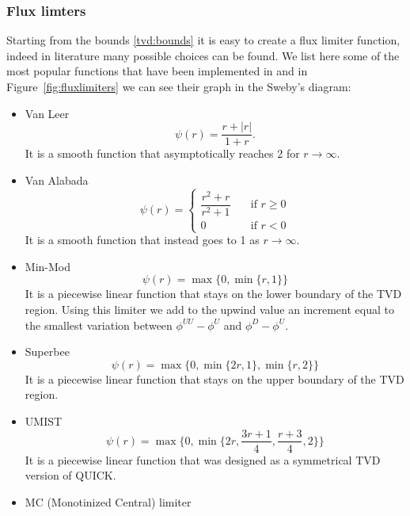 \subsubsection{Flux limters}
Starting from the bounds \eqref{tvd:bounds} it is easy to create a 
flux limiter function, indeed in literature many possible choices can be 
found. 
We list here some of the most popular functions that have been implemented in 
\DUMUX and in Figure~\ref{fig:fluxlimiters} we can see their graph in the 
Sweby's diagram:
\begin{itemize}
	\item Van Leer \cite{tvd:vanleer}
	\begin{equation} \label{eq:vl}
	\psi(r) = \frac{r+|r|}{1+r}.
	\end{equation}
	It is a smooth function that asymptotically reaches 2 for $r \rightarrow 
	\infty$.
%
	\item Van Alabada \cite{tvd:vanalabada}
	\begin{equation}
	\psi(r)=
	\begin{cases}
	\dfrac{r^2+r}{r^2+1} \quad &\text{if $r\geq 0$}\\[2ex]
	0 \quad &\text{if $r<0$}
	\end{cases}
	\end{equation}
	It is a smooth function that instead goes to 1 as $r \rightarrow \infty$.
%
	\item Min-Mod \cite{tvd:roe}
	\begin{equation}
	\psi(r) = \max \{0, \min \{ r,1\} \}
	\end{equation}
	It is a piecewise linear function that stays on the lower boundary of the 
	TVD region. Using this limiter we add to the upwind value an increment 
	equal to the smallest variation between $\phi^{UU}-\phi^U$ and $\phi^D - 
	\phi^U$.
%
	\item Superbee \cite{tvd:roe}
	\begin{equation}
	\psi(r)=\max \{0, \min \{ 2r, 1\}, \min \{ r, 2\} \}
	\end{equation}
	It is a piecewise linear function that stays on the upper boundary of the 
	TVD region.
%
	\item UMIST \cite{tvd:lien}
	\begin{equation}
	\psi(r)=\max \bigg\{0, \min \bigg\{ 2r, \frac{3r+1}{4},\frac{r+3}{4}, 
	2\bigg\} \bigg\}
	\end{equation}
	It is a piecewise linear function that was designed as a symmetrical TVD 
	version of QUICK.
%
	\item MC (Monotinized Central) limiter \cite{tvd:mclimiter}

\end{itemize}
